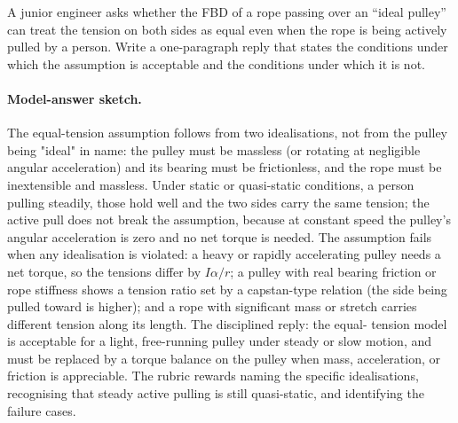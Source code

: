 \begin{exercise}
A junior engineer asks whether the FBD of a rope passing over an
``ideal pulley'' can treat the tension on both sides as equal even
when the rope is being actively pulled by a person. Write a
one-paragraph reply that states the conditions under which the
assumption is acceptable and the conditions under which it is not.
\paragraph{Model-answer sketch.} The equal-tension assumption follows
from two idealisations, not from the pulley being "ideal" in name: the
pulley must be massless (or rotating at negligible angular acceleration)
and its bearing must be frictionless, and the rope must be inextensible
and massless. Under static or quasi-static conditions, a person pulling
steadily, those hold well and the two sides carry the same tension; the
active pull does not break the assumption, because at constant speed the
pulley's angular acceleration is zero and no net torque is needed. The
assumption fails when any idealisation is violated: a heavy or rapidly
accelerating pulley needs a net torque, so the tensions differ by
$I\alpha/r$; a pulley with real bearing friction or rope stiffness shows
a tension ratio set by a capstan-type relation (the side being pulled
toward is higher); and a rope with significant mass or stretch carries
different tension along its length. The disciplined reply: the equal-
tension model is acceptable for a light, free-running pulley under
steady or slow motion, and must be replaced by a torque balance on the
pulley when mass, acceleration, or friction is appreciable. The rubric
rewards naming the specific idealisations, recognising that steady
active pulling is still quasi-static, and identifying the failure cases.
\end{exercise}

